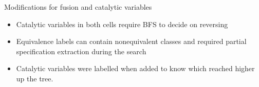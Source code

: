 \begin{frame}{Modifications for fusion and catalytic variables}
    \begin{itemize}
        \item Catalytic variables in both cells require BFS to decide on reversing
        \item Equivalence labels can contain nonequivalent classes and required partial specification extraction during the search
        \item Catalytic variables were labelled when added to know which reached higher up the tree.
    \end{itemize}
\end{frame}